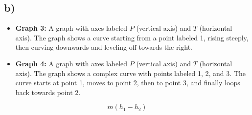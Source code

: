 

\subsection*{b)}

\begin{itemize}
    \item \textbf{Graph 3:} A graph with axes labeled $P$ (vertical axis) and $T$ (horizontal axis). The graph shows a curve starting from a point labeled 1, rising steeply, then curving downwards and leveling off towards the right.
    \item \textbf{Graph 4:} A graph with axes labeled $P$ (vertical axis) and $T$ (horizontal axis). The graph shows a complex curve with points labeled 1, 2, and 3. The curve starts at point 1, moves to point 2, then to point 3, and finally loops back towards point 2.
\end{itemize}

\[
\dot{m} (h_1 - h_2)
\]